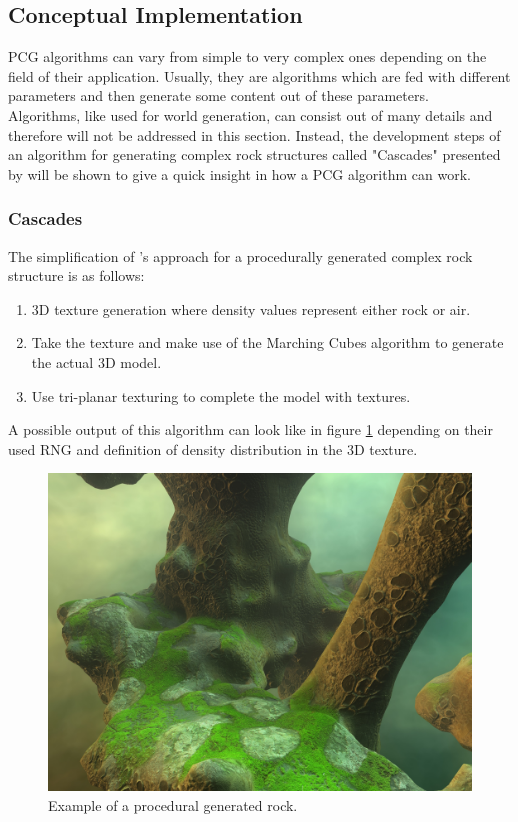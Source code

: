 \documentclass[MGS,Master,english]{twbook}%
\begin{document}
\subsection{Conceptual Implementation}
PCG algorithms can vary from simple to very complex ones depending on the field of their application. Usually, they are algorithms which are fed with different parameters and then generate some content out of these parameters.\\
Algorithms, like used for world generation, can consist out of many details and therefore will not be addressed in this section. Instead, the development steps of an algorithm for generating complex rock structures called "Cascades" presented by \cite{nvidia::cascades} will be shown to give a quick insight in how a PCG algorithm can work.

\subsubsection{Cascades}
The simplification of \cite{nvidia::cascades}'s approach for a procedurally generated complex rock structure is as follows:
\begin{enumerate}
	\item 3D texture generation where density values represent either rock or air.
	\item Take the texture and make use of the Marching Cubes algorithm to generate the actual 3D model.
	\item Use tri-planar texturing to complete the model with textures.
\end{enumerate}
A possible output of this algorithm can look like in figure \ref{cascadesFigure} depending on their used \ac{RNG} and definition of density distribution in the 3D texture. 
\begin{figure}[!htbp]
	\centering
	\includegraphics[width=0.5\linewidth]{PICs/cascades}
	\caption{Example of a procedural generated rock. \protect\cite{nvidia::cascades}}\label{cascadesFigure}
\end{figure}
\end{document}
